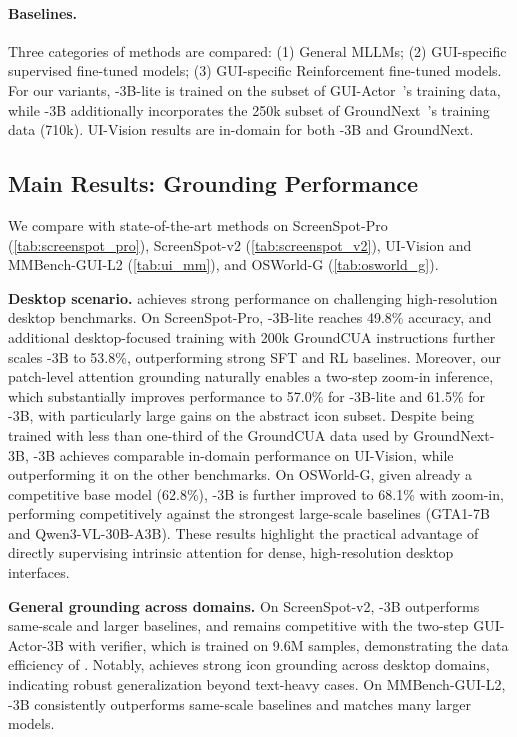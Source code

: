 \paragraph{Baselines.}Three categories of methods are compared: 
(1) General MLLMs; (2) GUI-specific supervised fine-tuned models; (3) GUI-specific Reinforcement fine-tuned models. For our variants, \method{}-3B-lite is trained on the subset of GUI-Actor~\citep{wu2025gui}'s training data, while \method{}-3B additionally incorporates the 250k subset of GroundNext~\citep{feizi2025grounding}'s training data (710k). UI-Vision results are in-domain for both \method{}-3B and GroundNext.

\subsection{Main Results: Grounding Performance}
We compare \method{} with state-of-the-art methods on ScreenSpot-Pro (\cref{tab:screenspot_pro}), ScreenSpot-v2 (\cref{tab:screenspot_v2}), UI-Vision and MMBench-GUI-L2 (\cref{tab:ui_mm}), and OSWorld-G (\cref{tab:osworld_g}).

\textbf{Desktop scenario.}
\method{} achieves strong performance on challenging high-resolution desktop benchmarks. On ScreenSpot-Pro, \method{}-3B-lite reaches 49.8\% accuracy, and additional desktop-focused training with 200k GroundCUA instructions further scales \method{}-3B to 53.8\%, outperforming strong SFT and RL baselines. Moreover, our patch-level attention grounding naturally enables a two-step zoom-in inference, which substantially improves performance to 57.0\% for \method{}-3B-lite and 61.5\% for \method{}-3B, with particularly large gains on the abstract icon subset. Despite being trained with less than one-third of the GroundCUA data used by GroundNext-3B, \method{}-3B achieves comparable in-domain performance on UI-Vision, while outperforming it on the other benchmarks. On OSWorld-G,  given already a competitive base model (62.8\%), \method{}-3B is further improved to 68.1\% with zoom-in, performing competitively against the strongest large-scale baselines (GTA1-7B and Qwen3-VL-30B-A3B). These results highlight the practical advantage of directly supervising intrinsic attention for dense, high-resolution desktop interfaces.

\textbf{General grounding across domains.}
On ScreenSpot-v2, \method{}-3B outperforms same-scale and larger baselines, and remains competitive with the two-step GUI-Actor-3B with verifier, which is trained on 9.6M samples, demonstrating the data efficiency of \method{}. Notably, \method{} achieves strong icon grounding across desktop domains, indicating robust generalization beyond text-heavy cases. On MMBench-GUI-L2, \method{}-3B consistently outperforms same-scale baselines and matches many larger models.

